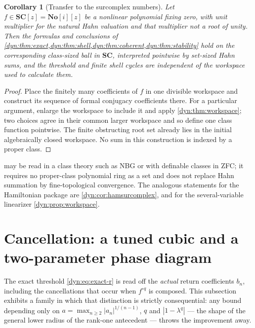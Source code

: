 \documentclass[11pt,letterpaper]{article}
\newtheorem{corollary}[corollary]{Corollary}
\theoremstyle{definition}
\theoremstyle{remark}
\newcommand{\No}{\mathbf{No}}
\newcommand{\SC}{\mathbf{SC}}
\numberwithin{equation}{section}
\begin{document}
\begin{corollary}[Transfer to the surcomplex numbers]
\label{dyn:cor:surcomplex}
Let $f\in\SC[z]=\No[i][z]$ be a nonlinear polynomial fixing zero, with unit
multiplier for the natural Hahn valuation and that multiplier not a root of
unity. Then the formulas and conclusions of
\cref{dyn:thm:exact,dyn:thm:shell,dyn:thm:coherent,dyn:thm:stability} hold
on the corresponding class-sized ball in $\SC$, interpreted pointwise by
set-sized Hahn sums, and the threshold and finite shell cycles are
independent of the workspace used to calculate them.
\end{corollary}
\begin{proof}
Place the finitely many coefficients of $f$ in one divisible workspace and
construct its sequence of formal conjugacy coefficients there. For a
particular argument, enlarge the workspace to include it and apply
\cref{dyn:thm:workspace}; two choices agree in their common larger
workspace and so define one class function pointwise. The finite
obstructing root set already lies in the initial algebraically closed
workspace. No sum in this construction is indexed by a proper class.
\end{proof}

 may be read in a class theory such as NBG or with
definable classes in ZFC; it requires no proper-class polynomial ring as a
set and does not replace Hahn summation by fine-topological convergence. The
analogous statements for the Hamiltonian package are
\cref{dyn:cor:hamsurcomplex}, and for the several-variable linearizer
\cref{dyn:prop:workspace}.

\section{Cancellation: a tuned cubic and a two-parameter phase diagram}
\label{dyn:sec:phase}

The exact threshold \eqref{dyn:eq:exact-r} is read off the \emph{actual}
return coefficients $b_n$, including the cancellations that occur when
$f^{\circ q}$ is composed. This subsection exhibits a family in which that
distinction is strictly consequential: any bound depending only on
$a=\max_{n\ge2}|a_n|^{1/(n-1)}$, $q$ and $|1-\lambda^{q}|$ --- the shape of
the general lower radius of the rank-one antecedent
\cite[Thm.~1.1]{Lindahl} --- throws the improvement away.
\end{document}
